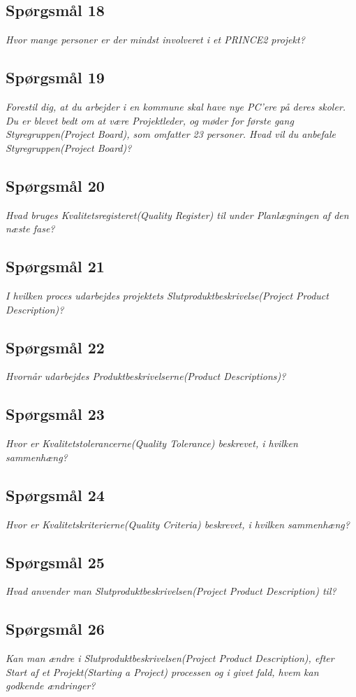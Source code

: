\documentclass[12pt,twoside]{article}
\begin{document}
    \subsection{Sp\o{}rgsm\r{a}l 18}
    \textit{Hvor mange personer er der mindst involveret i et PRINCE2 projekt?}
    \subsection{Sp\o{}rgsm\r{a}l 19}
    \textit{Forestil dig, at du arbejder i en kommune skal have nye PC’ere på deres skoler. Du er blevet bedt om at være Projektleder, og møder for første gang Styregruppen(Project Board), som omfatter 23 personer. Hvad vil du anbefale Styregruppen(Project Board)?}
    \subsection{Sp\o{}rgsm\r{a}l 20}
    \textit{Hvad bruges Kvalitetsregisteret(Quality Register) til under Planlægningen af den næste fase?}
    \subsection{Sp\o{}rgsm\r{a}l 21}
    \textit{I hvilken proces udarbejdes projektets Slutproduktbeskrivelse(Project Product Description)?}
    \subsection{Sp\o{}rgsm\r{a}l 22}
    \textit{Hvornår udarbejdes Produktbeskrivelserne(Product Descriptions)?}
    \subsection{Sp\o{}rgsm\r{a}l 23}
    \textit{Hvor er Kvalitetstolerancerne(Quality Tolerance) beskrevet, i hvilken sammenhæng?}
    \subsection{Sp\o{}rgsm\r{a}l 24}
    \textit{Hvor er Kvalitetskriterierne(Quality Criteria) beskrevet, i hvilken sammenhæng?}
    \subsection{Sp\o{}rgsm\r{a}l 25}
    \textit{Hvad anvender man Slutproduktbeskrivelsen(Project Product Description) til?}
    \subsection{Sp\o{}rgsm\r{a}l 26}
    \textit{Kan man ændre i Slutproduktbeskrivelsen(Project Product Description), efter Start af et Projekt(Starting a Project) processen og i givet fald, hvem kan godkende ændringer?}
\end{document}
